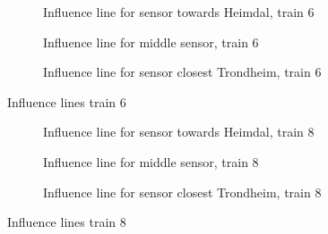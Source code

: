 \begin{figure}[h]
  \begin{subfigure}[t]{0.9\textwidth}
    \centering
    
    \caption{Influence line for sensor towards Heimdal, train 6}
    \label{infl_Heimdal_train6}
  \end{subfigure}
  \begin{subfigure}[t]{0.9\textwidth}
    \centering
    
    \caption{Influence line for middle sensor, train 6}
    \label{infl_middle_train6}
  \end{subfigure}
  \begin{subfigure}[t]{0.9\textwidth}
    \centering
    
    \caption{Influence line for sensor closest Trondheim, train 6}
    \label{infl_Trondheim_train6}
  \end{subfigure}
  \caption{Influence lines train 6}
  \label{influence_lines_train6}
\end{figure}

\begin{figure}[h]
  \begin{subfigure}[t]{0.9\textwidth}
    \centering
    
    \caption{Influence line for sensor towards Heimdal, train 8}
    \label{infl_Heimdal_train8}
  \end{subfigure}
  \begin{subfigure}[t]{0.9\textwidth}
    \centering
    
    \caption{Influence line for middle sensor, train 8}
    \label{infl_middle_train8}
  \end{subfigure}
  \begin{subfigure}[t]{0.9\textwidth}
    \centering
    
    \caption{Influence line for sensor closest Trondheim, train 8}
    \label{infl_Trondheim_train8}
  \end{subfigure}
  \caption{Influence lines train 8}
  \label{influence_lines_train8}
\end{figure}

